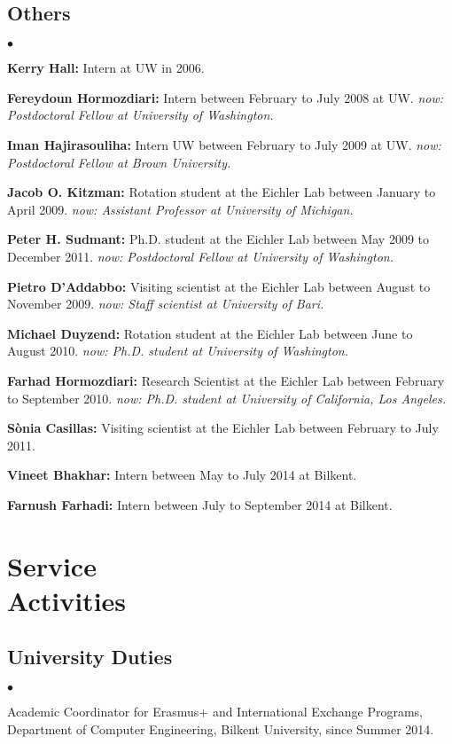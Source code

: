 \documentclass[margin,line]{res}
\newenvironment{list2}{
  \begin{list}{$\bullet$}{%
      \setlength{\itemsep}{0in}
      \setlength{\parsep}{0in} \setlength{\parskip}{0in}
      \setlength{\topsep}{0in} \setlength{\partopsep}{0in} 
      \setlength{\leftmargin}{0.2in}}}{\end{list}}
\begin{document}
\begin{resume}
\subsection{\small \sc Others}
\begin{list2}
\item
{\bf Kerry Hall:} Intern at UW in 2006. 
\item
{\bf Fereydoun Hormozdiari:} Intern between February to July 2008 at UW. 
{\it now: Postdoctoral Fellow at University of Washington.}
\item
{\bf Iman Hajirasouliha:}  Intern UW between February to July 2009 at UW.
{\it now: Postdoctoral Fellow at Brown University.}
\item
{\bf Jacob O. Kitzman:} Rotation student at the Eichler Lab between January to April 2009.
{\it now: Assistant Professor at University of Michigan.}
\item
{\bf Peter H. Sudmant:} Ph.D. student at the Eichler Lab between May 2009 to December 2011.
{\it now: Postdoctoral Fellow at University of Washington.}
\item
{\bf Pietro D'Addabbo:} Visiting scientist at the Eichler Lab between August to November 2009.
{\it now: Staff scientist at University of Bari.}
\item
{\bf Michael Duyzend:} Rotation student at the Eichler Lab between June to August 2010.
{\it now: Ph.D. student at University of Washington.}
\item
{\bf Farhad Hormozdiari:} Research Scientist at the Eichler Lab between February to September 2010.
{\it now: Ph.D. student at University of California, Los Angeles.}
\item
{\bf S\`{o}nia Casillas:} Visiting scientist at the Eichler Lab between February to July 2011.
\item
{\bf Vineet Bhakhar:} Intern between May to July 2014 at Bilkent. 
\item
{\bf Farnush Farhadi:} Intern between July to September 2014 at Bilkent. 
\end{list2}

\vspace*{-.2cm}
\section{\sc Service \\ Activities}
\vspace{-0.3cm}
\subsection{\small \sc University Duties}
\begin{list2}
\item
  Academic Coordinator for Erasmus+ and International Exchange Programs, Department of Computer Engineering, Bilkent University, since Summer 2014.
\end{list2}
\vspace{-0.6cm}


\end{resume}
\end{document}
